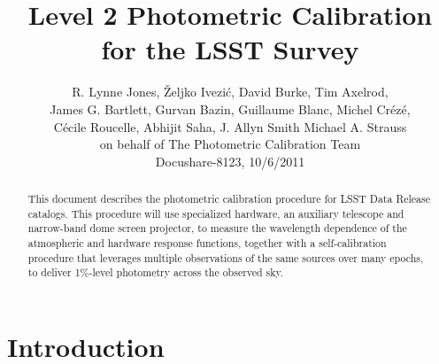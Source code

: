 \documentclass[12pt,preprint]{aastex}
\begin{document}
\title{Level 2 Photometric Calibration for the LSST Survey}

\author{
R. Lynne Jones, {\v Z}eljko Ivezi{\'c}, David Burke, Tim Axelrod, \\
James G. Bartlett, 
Gurvan Bazin,
Guillaume Blanc, 
Michel Cr{\'e}z{\'e}, \\ 
C{\'e}cile Roucelle, 
Abhijit Saha, 
J. Allyn Smith
Michael A. Strauss \\
on behalf of 
The Photometric Calibration Team \\ 
Docushare-8123, 10/6/2011 \\
}



\begin{abstract}
This document describes the photometric calibration procedure for LSST
Data Release catalogs. This procedure will use specialized hardware, 
an auxiliary telescope and narrow-band dome screen projector, to
measure the wavelength dependence of the atmospheric and hardware
response functions, together with a self-calibration procedure that
leverages multiple observations of the same sources over many epochs,
to deliver 1\%-level photometry across the observed sky.
\end{abstract}

\tableofcontents

\section{Introduction}
\end{document}

